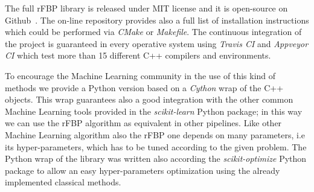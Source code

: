 \documentclass{standalone}
\begin{document}
The full rFBP library is released under MIT license and it is open-source on Github~\cite{ReplicatedFocusingBeliefPropagation}.
The on-line repository provides also a full list of installation instructions which could be performed via \emph{CMake} or \emph{Makefile}.
The continuous integration of the project is guaranteed in every operative system using \emph{Travis CI} and \emph{Appveyor CI} which test more than 15 different C++ compilers and environments.

To encourage the Machine Learning community in the use of this kind of methods we provide a Python version based on a \emph{Cython} wrap of the C++ objects.
This wrap guarantees also a good integration with the other common Machine Learning tools provided in the \emph{scikit-learn} Python package; in this way we can use the rFBP algorithm as equivalent in other pipelines.
Like other Machine Learning algorithm also the rFBP one depends on many parameters, i.e its hyper-parameters, which has to be tuned according to the given problem.
The Python wrap of the library was written also according the \emph{scikit-optimize} Python package to allow an easy hyper-parameters optimization using the already implemented classical methods.

\end{document}
